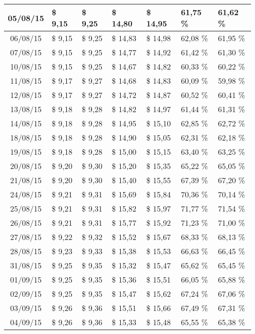 \begin{center}
\begin{longtable}{|c|p{1.5cm}|p{1.5cm}|p{1.5cm}|p{1.5cm}|p{1.5cm}|p{1.5cm}|}
05/08/15 & \$ 9,15 & \$ 9,25 & \$ 14,80 & \$ 14,95 & 61,75 \% & 61,62 \% \\ \hline
06/08/15 & \$ 9,15 & \$ 9,25 & \$ 14,83 & \$ 14,98 & 62,08 \% & 61,95 \% \\ \hline
07/08/15 & \$ 9,15 & \$ 9,25 & \$ 14,77 & \$ 14,92 & 61,42 \% & 61,30 \% \\ \hline
10/08/15 & \$ 9,15 & \$ 9,25 & \$ 14,67 & \$ 14,82 & 60,33 \% & 60,22 \% \\ \hline
11/08/15 & \$ 9,17 & \$ 9,27 & \$ 14,68 & \$ 14,83 & 60,09 \% & 59,98 \% \\ \hline
12/08/15 & \$ 9,17 & \$ 9,27 & \$ 14,72 & \$ 14,87 & 60,52 \% & 60,41 \% \\ \hline
13/08/15 & \$ 9,18 & \$ 9,28 & \$ 14,82 & \$ 14,97 & 61,44 \% & 61,31 \% \\ \hline
14/08/15 & \$ 9,18 & \$ 9,28 & \$ 14,95 & \$ 15,10 & 62,85 \% & 62,72 \% \\ \hline
18/08/15 & \$ 9,18 & \$ 9,28 & \$ 14,90 & \$ 15,05 & 62,31 \% & 62,18 \% \\ \hline
19/08/15 & \$ 9,18 & \$ 9,28 & \$ 15,00 & \$ 15,15 & 63,40 \% & 63,25 \% \\ \hline
20/08/15 & \$ 9,20 & \$ 9,30 & \$ 15,20 & \$ 15,35 & 65,22 \% & 65,05 \% \\ \hline
21/08/15 & \$ 9,20 & \$ 9,30 & \$ 15,40 & \$ 15,55 & 67,39 \% & 67,20 \% \\ \hline
24/08/15 & \$ 9,21 & \$ 9,31 & \$ 15,69 & \$ 15,84 & 70,36 \% & 70,14 \% \\ \hline
25/08/15 & \$ 9,21 & \$ 9,31 & \$ 15,82 & \$ 15,97 & 71,77 \% & 71,54 \% \\ \hline
26/08/15 & \$ 9,21 & \$ 9,31 & \$ 15,77 & \$ 15,92 & 71,23 \% & 71,00 \% \\ \hline
27/08/15 & \$ 9,22 & \$ 9,32 & \$ 15,52 & \$ 15,67 & 68,33 \% & 68,13 \% \\ \hline
28/08/15 & \$ 9,23 & \$ 9,33 & \$ 15,38 & \$ 15,53 & 66,63 \% & 66,45 \% \\ \hline
31/08/15 & \$ 9,25 & \$ 9,35 & \$ 15,32 & \$ 15,47 & 65,62 \% & 65,45 \% \\ \hline
01/09/15 & \$ 9,25 & \$ 9,35 & \$ 15,36 & \$ 15,51 & 66,05 \% & 65,88 \% \\ \hline
02/09/15 & \$ 9,25 & \$ 9,35 & \$ 15,47 & \$ 15,62 & 67,24 \% & 67,06 \% \\ \hline
03/09/15 & \$ 9,26 & \$ 9,36 & \$ 15,51 & \$ 15,66 & 67,49 \% & 67,31 \% \\ \hline
04/09/15 & \$ 9,26 & \$ 9,36 & \$ 15,33 & \$ 15,48 & 65,55 \% & 65,38 \% \\ \hline

\end{longtable}
\end{center}
